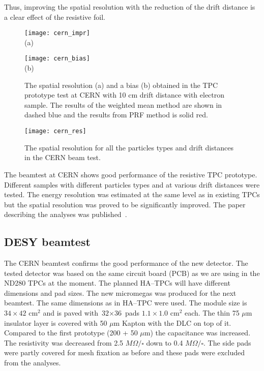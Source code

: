 \documentclass[../main.tex]{subfiles}
\begin{document}
Thus, improving the spatial resolution with the reduction of the drift distance is a clear effect of the resistive foil.

\begin{figure}[!ht]
  \centering
  \begin{minipage}{0.49\linewidth}
    \centering
    \texttt{[image: cern\_impr]} \\ (a)
  \end{minipage}
  \begin{minipage}{0.49\linewidth}
    \centering
    \texttt{[image: cern\_bias]} \\ (b)
  \end{minipage}
  \caption{The spatial resolution (a) and a bias (b) obtained in the TPC prototype test at CERN with 10 cm drift distance with electron sample. The results of the weighted mean method are shown in dashed blue and the results from PRF method is solid red.}
  \label{fig:tpc:cern_sr}
\end{figure}

\begin{figure}[!ht]
  \centering
  \texttt{[image: cern\_res]}
  \caption{The spatial resolution for all the particles types and drift distances in the CERN beam test.}
  \label{fig:tpc:sr_tot}
\end{figure}

The beamtest at CERN shows good performance of the resistive TPC prototype. Different samples with different particles types and at various drift distances were tested. The energy resolution was estimated at the same level as in existing TPCs but the spatial resolution was proved to be significantly improved. The paper describing the analyses was published~\cite{Attie2019b}.

\subsection{DESY beamtest}
The CERN beamtest confirms the good performance of the new detector. The tested detector was based on the same circuit board (PCB) as we are using in the ND280 TPCs at the moment. The planned HA--TPCs will have different dimensions and pad sizes. The new micromegas was produced for the next beamtest. The same dimensions as in HA--TPC were used. The module size is $\text{34}\times\text{42}\text{ cm}^2$ and is paved with $\text{32}\times\text{36}$ pads $\text{1.1}\times\text{1.0}\text{ cm}^2$ each. The thin 75 $\mu\text{m}$ insulator layer is covered with 50 $\mu\text{m}$ Kapton with the DLC on top of it. Compared to the first prototype (200 + 50 $\mu\text{m}$) the capacitance was increased. The resistivity was decreased from 2.5 $M\Omega/\square$ down to 0.4 $M\Omega/\square$. The side pads were partly covered for mesh fixation as before and these pads were excluded from the analyses.
\end{document}
